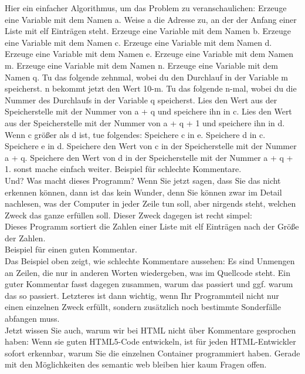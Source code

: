 Hier ein einfacher Algorithmus, um das Problem zu veranschaulichen:
Erzeuge eine Variable mit dem Namen a.
Weise a die Adresse zu, an der der Anfang einer Liste mit elf Einträgen steht.
Erzeuge eine Variable mit dem Namen b.
Erzeuge eine Variable mit dem Namen c.
Erzeuge eine Variable mit dem Namen d.
Erzeuge eine Variable mit dem Namen e.
Erzeuge eine Variable mit dem Namen m.
Erzeuge eine Variable mit dem Namen n.
Erzeuge eine Variable mit dem Namen q.
Tu das folgende zehnmal, wobei du den Durchlauf in der Variable m speicherst.
n bekommt jetzt den Wert 10-m.
Tu das folgende n-mal, wobei du die Nummer des Durchlaufs in der Variable q speicherst.
Lies den Wert aus der Speicherstelle mit der Nummer von a + q und speichere ihn in c.
Lies den Wert aus der Speicherstelle mit der Nummer von a + q + 1 und speichere ihn in d.
Wenn c größer als d ist, tue folgendes:
Speichere c in e.
Speichere d in c.
Speichere e in d.
Speichere den Wert von c in der Speicherstelle mit der Nummer a + q.
Speichere den Wert von d in der Speicherstelle mit der Nummer a + q + 1.
sonst mache einfach weiter. 
Beispiel für schlechte Kommentare.\\

Und? Was macht dieses Programm? Wenn Sie jetzt sagen, dass Sie das nicht erkennen können, dann ist das kein Wunder, denn Sie können zwar im Detail nachlesen, was der Computer in jeder Zeile tun soll, aber nirgends steht, welchen Zweck das ganze erfüllen soll. Dieser Zweck dagegen ist recht simpel:\\

Dieses Programm sortiert die Zahlen einer Liste mit elf Einträgen nach der Größe der Zahlen.\\

Beispiel für einen guten Kommentar.\\

Das Beispiel oben zeigt, wie schlechte Kommentare aussehen: Es sind Unmengen an Zeilen, die nur in anderen Worten wiedergeben, was im Quellcode steht. Ein guter Kommentar fasst dagegen zusammen, warum das passiert und ggf. warum das so passiert. Letzteres ist dann wichtig, wenn Ihr Programmteil nicht nur einen einzelnen Zweck erfüllt, sondern zusätzlich noch bestimmte Sonderfälle abfangen muss.\\

Jetzt wissen Sie auch, warum wir bei HTML nicht über Kommentare gesprochen haben: Wenn sie guten HTML5-Code entwickeln, ist für jeden HTML-Entwickler sofort erkennbar, warum Sie die einzelnen Container programmiert haben. Gerade mit den Möglichkeiten des semantic web bleiben hier kaum Fragen offen.\\

